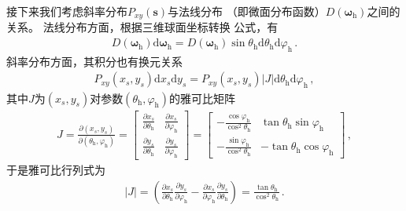 接下来我们考虑斜率分布$P_{xy}({\bm s})$与法线分布
（即微面分布函数）$D({\bm\omega}_{\mathrm{h}})$之间的关系。
法线分布方面，根据三维球面坐标转换
公式，有
\begin{align}\label{eq:08-ex01-D_sphere}
    D({\bm\omega}_{\mathrm{h}})\mathrm{d}{\bm\omega}_{\mathrm{h}}
    =D({\bm\omega}_{\mathrm{h}})\sin\theta_{\mathrm{h}}\mathrm{d}\theta_{\mathrm{h}}\mathrm{d}\varphi_{\mathrm{h}}\, .
\end{align}
斜率分布方面，其积分也有换元关系
\begin{align}\label{eq:08-ex01-Pxy-Jacobian}
    P_{xy}(x_s,y_s)\mathrm{d}x_s\mathrm{d}y_s
    =P_{xy}(x_s,y_s)|J|\mathrm{d}\theta_{\mathrm{h}}\mathrm{d}\varphi_{\mathrm{h}}\, ,
\end{align}
其中$J$为$(x_s,y_s)$对参数$(\theta_{\mathrm{h}},\varphi_{\mathrm{h}})$的雅可比矩阵
\begin{align}
    J=\displaystyle\frac{\partial(x_s,y_s)}{\partial(\theta_{\mathrm{h}},\varphi_{\mathrm{h}})}
    =\displaystyle\left[\begin{array}{cc}
            \displaystyle\frac{\partial x_s}{\partial \theta_{\mathrm{h}}} &
            \displaystyle\frac{\partial x_s}{\partial \varphi_{\mathrm{h}}}  \\
            \displaystyle\frac{\partial y_s}{\partial \theta_{\mathrm{h}}} &
            \displaystyle\frac{\partial y_s}{\partial \varphi_{\mathrm{h}}}
        \end{array}\right]
    =\displaystyle\left[\begin{array}{rr}
            \displaystyle -\frac{\cos\varphi_{\mathrm{h}}}{\cos^2\theta_{\mathrm{h}}} &
            \displaystyle \tan\theta_{\mathrm{h}}\sin\varphi_{\mathrm{h}}               \\
            \displaystyle -\frac{\sin\varphi_{\mathrm{h}}}{\cos^2\theta_{\mathrm{h}}} &
            \displaystyle -\tan\theta_{\mathrm{h}}\cos\varphi_{\mathrm{h}}
        \end{array}\right]\, ,
\end{align}
于是雅可比行列式为
\begin{align}\label{eq:08-ex01-Jacobian-slope-normals}
    |J|=\left(\frac{\partial x_s}{\partial \theta_{\mathrm{h}}}\frac{\partial y_s}{\partial \varphi_{\mathrm{h}}}
    -\frac{\partial x_s}{\partial \varphi_{\mathrm{h}}}\frac{\partial y_s}{\partial \theta_{\mathrm{h}}}\right)
    =\frac{\tan\theta_{\mathrm{h}}}{\cos^2\theta_{\mathrm{h}}}\, .
\end{align}
